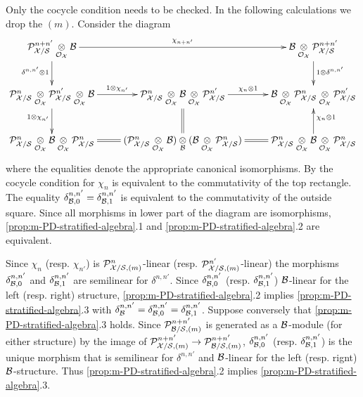 \documentclass{article}
\theoremstyle{change}
\numberwithin{equation}{subsubsection}
\newcommand{\demobox}{\vrule height6pt width6pt depth0pt}
\newenvironment{demo}{\noindent{\it Proof.}}
{{\unskip\nobreak\hfil\qquad
\demobox\parfillskip=0pt\par}
\medskip}
\newcommand{\tensu}[1]{\underset{{#1}}{\otimes}}
\begin{document}
\begin{demo}
  Only the cocycle condition needs to be checked.  In the following
  calculations we drop the $(m)$. Consider the diagram
  \begin{displaymath}
    \xymatrix{
      \cP^{n+n'}_{\cX/\cS}\tensu{\O_\cX}{\cB}\ar[rr]^{\chi_{n+n'}}
      \ar[d]_{\delta^{n,n'}\tens1}
      &&
      \cB\tensu{\O_\cX}{\cP^{n+n'}_{\cX/\cS}}\ar[d]^{1\tens\delta^{n,n'}}\\
      \cP^n_{\cX/\cS}\tensu{\O_\cX}{\cP^{n'}_{\cX/\cS}}\tensu{\O_\cX}{\cB}
      \ar[r]^{1\tens\chi_{n'}}
      \ar[d]_{1\tens\chi_{n'}}
      &\cP^n_{\cX/\cS}\tensu{\O_\cX}{\cB}\tensu{\O_\cX}{\cP^{n'}_{\cX/\cS}}
      \ar[r]^{\chi_n\tens1}\ar@{=}[d]
      &\cB\tensu{\O_\cX}{\cP^n_{\cX/\cS}}\tensu{\O_\cX}{\cP^{n'}_{\cX/\cS}}
      \\
      \cP^n_{\cX/\cS}\tensu{\O_\cX}{\cB}\tensu{\O_\cX}{\cP^n_{\cX/\cS}}
      \ar@{=}[r]
      &(\cP^n_{\cX/\cS}\tensu{\O_\cX}{\cB})\tensu\cB(\cB
      \tensu{\O_\cX}{\cP^n_{\cX/\cS}})\ar@{=}[r]
      &\cP^n_{\cX/\cS}\tensu{\O_\cX}{\cB}\tensu{\O_\cX}{\cP^n_{\cX/\cS}}
      \ar[u]_{\chi_n\tens1}
    }
  \end{displaymath}
  where the equalities denote the appropriate canonical isomorphisms. By
  \cite[Prop. 2.3.2]{berthelot:1996} the cocycle condition for $\chi_n$
  is equivalent to the commutativity of the top rectangle. The equality
  $\delta^{n,n'}_{{\cal B},0}=\delta^{n,n'}_{{\cal B},1}$ is equivalent to the
  commutativity of the outside square. Since all morphisms in lower part
  of the diagram are isomorphisms, \ref{prop:m-PD-stratified-algebra}.1
  and \ref{prop:m-PD-stratified-algebra}.2 are equivalent.

  Since $\chi_n$ (resp. $\chi_{n'}$) is ${\cal P}^n_{{\cal X}/{\cal S},(m)}$-linear
  (resp. ${\cal P}^{n'}_{{\cal X}/{\cal S},(m)}$-linear) the morphisms
  $\delta^{n,n'}_{{\cal B},0}$ and $\delta^{n,n'}_{{\cal B},1}$ are semilinear
  for $\delta^{n,n'}$. Since $\delta^{n,n'}_{{\cal B},0}$
  (resp. $\delta^{n,n'}_{{\cal B},1}$) ${\cal B}$-linear for the left
  (resp. right) structure, \ref{prop:m-PD-stratified-algebra}.2
  implies \ref{prop:m-PD-stratified-algebra}.3 with
  $\delta^{n,n'}_{\cal B}= \delta^{n,n'}_{{\cal B},0}=\delta^{n,n'}_{{\cal B},1}$.
  Suppose conversely that \ref{prop:m-PD-stratified-algebra}.3
  holds. Since ${\cal P}^{n+n'}_{{\cal B}/{\cal S},(m)}$ is generated as a
  ${\cal B}$-module (for either structure) by the image of
  ${\cal P}^{n+n'}_{{\cal X}/{\cal S},(m)}\to{\cal P}^{n+n'}_{{\cal B}/{\cal S},(m)}$,
  $\delta^{n,n'}_{{\cal B},0}$ (resp. $\delta^{n,n'}_{{\cal B},1}$) is the
  unique morphism that is semilinear for $\delta^{n,n'}$ and
  ${\cal B}$-linear for the left (resp. rignt) ${\cal B}$-structure. Thus
  \ref{prop:m-PD-stratified-algebra}.2 implies
  \ref{prop:m-PD-stratified-algebra}.3.
\end{demo}
\end{document}
